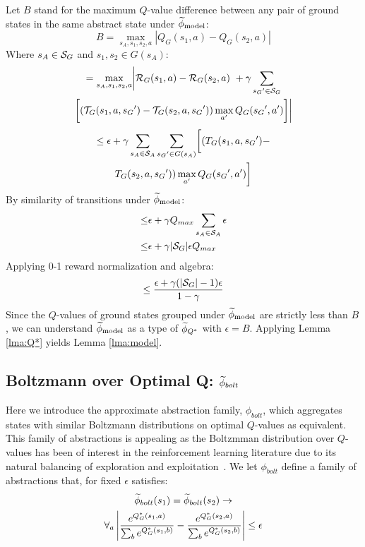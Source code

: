 Let $B$ stand for the maximum $Q$-value difference between any pair of ground states in the same abstract state under $\widetilde \phi_{\text{model}}$:
\begin{equation*}
B = \max_{s_A, s_1, s_2, a}  |Q_G(s_1, a) - Q_G(s_2, a)|
\end{equation*}
Where $s_A \in \mathcal{S}_G$ and $s_1, s_2 \in G(s_A)$:
\begin{multline*}
=\max_{s_A, s_1, s_2, a}      \biggl|\mathcal{R}_G(s_1, a) - \mathcal{R}_G(s_2, a)\ + \gamma \sum_{{s_G}' \in \mathcal{S}_G} \\
\biggl[(\mathcal{T}_G(s_1,a,{s_G}') -\mathcal{T}_G(s_2, a, {s_G}'))\max_{a'}Q_G({s_G}', a')\biggr]\biggr|
\end{multline*}
\begin{multline*}
\leq \epsilon + \gamma \sum_{s_A \in \mathcal{S}_A}\sum_{{s_G}' \in G(s_A)} \biggl[(T_G(s_1, a, {s_G}') -\\ 
T_G(s_2, a, {s_G}')) \max_{a'}Q_G({s_G}', a') \biggr]
\end{multline*}
By similarity of transitions under $\widetilde \phi_{\text{model}}$:
\begin{align*}
 \leq &\epsilon + \gamma Q_{max} \sum_{s_A \in \mathcal{S}_A} \epsilon \\
\leq& \epsilon + \gamma|\mathcal{S}_G|\epsilon Q_{max}
\end{align*}
Applying 0-1 reward normalization and algebra:
\begin{equation*}
 \leq \frac{\epsilon + \gamma(|\mathcal{S}_G| - 1) \epsilon}{1-\gamma}
\end{equation*}
Since the $Q$-values of ground states grouped under $\widetilde \phi_{\text{model}}$ are strictly less than $B$, we can understand $\widetilde \phi_{\text{model}}$ as a type of $\widetilde \phi_{Q^*}$ with $\epsilon = B$. Applying Lemma \ref{lma:Q*} yields Lemma \ref{lma:model}.
\subsection{Boltzmann over Optimal Q: $\widetilde \phi_{bolt}$}
\label{sec:boltz}

Here we introduce the approximate abstraction family, $\phi_{bolt}$, which aggregates states with similar Boltzmann distributions on optimal $Q$-values as equivalent. This family of abstractions is appealing as the Boltzmman distribution over $Q$-values has been of interest in the reinforcement learning literature due to its natural balancing of exploration and exploitation~\cite{sutton1998reinforcement}.
We let $\phi_{bolt}$ define a family of abstractions that, for fixed $\epsilon$ satisfies:
\begin{multline}
\widetilde \phi_{bolt}(s_1) = \widetilde \phi_{bolt}(s_2) \rightarrow \\
\forall_{a} \left|\frac{e^{Q_G^*(s_1,a)}}{\sum_b e^{Q_G^*(s_1,b)}} - \frac{e^{Q_G^*(s_2,a)}}{\sum_b e^{Q_G^*(s_2,b)}}\right| \leq \epsilon
\label{eq:phi_bolt}
\end{multline}
\edefn


